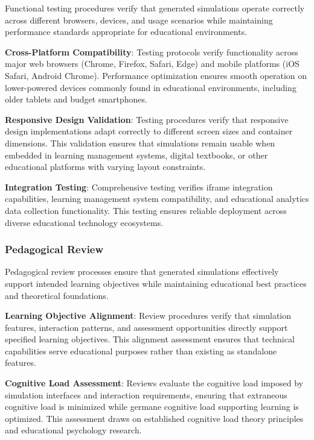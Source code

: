 Functional testing procedures verify that generated simulations operate correctly across different browsers, devices, and usage scenarios while maintaining performance standards appropriate for educational environments.

\textbf{Cross-Platform Compatibility}: Testing protocols verify functionality across major web browsers (Chrome, Firefox, Safari, Edge) and mobile platforms (iOS Safari, Android Chrome). Performance optimization ensures smooth operation on lower-powered devices commonly found in educational environments, including older tablets and budget smartphones.

\textbf{Responsive Design Validation}: Testing procedures verify that responsive design implementations adapt correctly to different screen sizes and container dimensions. This validation ensures that simulations remain usable when embedded in learning management systems, digital textbooks, or other educational platforms with varying layout constraints.

\textbf{Integration Testing}: Comprehensive testing verifies iframe integration capabilities, learning management system compatibility, and educational analytics data collection functionality. This testing ensures reliable deployment across diverse educational technology ecosystems.

\subsubsection{Pedagogical Review}

Pedagogical review processes ensure that generated simulations effectively support intended learning objectives while maintaining educational best practices and theoretical foundations.

\textbf{Learning Objective Alignment}: Review procedures verify that simulation features, interaction patterns, and assessment opportunities directly support specified learning objectives. This alignment assessment ensures that technical capabilities serve educational purposes rather than existing as standalone features.

\textbf{Cognitive Load Assessment}: Reviews evaluate the cognitive load imposed by simulation interfaces and interaction requirements, ensuring that extraneous cognitive load is minimized while germane cognitive load supporting learning is optimized. This assessment draws on established cognitive load theory principles and educational psychology research.

